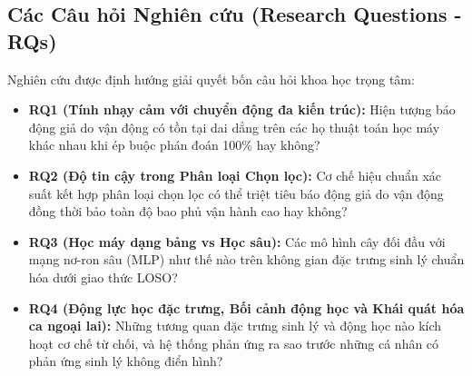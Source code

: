 \documentclass[conference]{IEEEtran}
\begin{document}
\subsection{Các Câu hỏi Nghiên cứu (Research Questions - RQs)}
Nghiên cứu được định hướng giải quyết bốn câu hỏi khoa học trọng tâm:
\begin{itemize}
    \item \textbf{RQ1 (Tính nhạy cảm với chuyển động đa kiến trúc):} Hiện tượng báo động giả do vận động có tồn tại dai dẳng trên các họ thuật toán học máy khác nhau khi ép buộc phán đoán 100\% hay không?
    \item \textbf{RQ2 (Độ tin cậy trong Phân loại Chọn lọc):} Cơ chế hiệu chuẩn xác suất kết hợp phân loại chọn lọc có thể triệt tiêu báo động giả do vận động đồng thời bảo toàn độ bao phủ vận hành cao hay không?
    \item \textbf{RQ3 (Học máy dạng bảng vs Học sâu):} Các mô hình cây đối đầu với mạng nơ-ron sâu (MLP) như thế nào trên không gian đặc trưng sinh lý chuẩn hóa dưới giao thức LOSO?
    \item \textbf{RQ4 (Động lực học đặc trưng, Bối cảnh động học và Khái quát hóa ca ngoại lai):} Những tương quan đặc trưng sinh lý và động học nào kích hoạt cơ chế từ chối, và hệ thống phản ứng ra sao trước những cá nhân có phản ứng sinh lý không điển hình?
\end{itemize}
\end{document}
